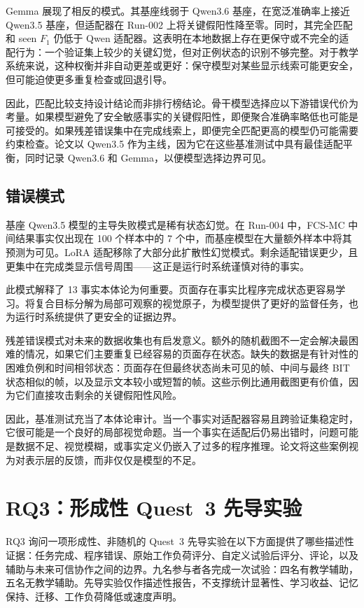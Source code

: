 Gemma 展现了相反的模式。其基座线弱于 Qwen3.6 基座，在宽泛准确率上接近 Qwen3.5 基座，但适配器在 Run-002 上将关键假阳性降至零。同时，其完全匹配和 seen \(F_1\) 仍低于 Qwen 适配器。这表明在本地数据上存在更保守或不完全的适配行为：一个验证集上较少的关键幻觉，但对正例状态的识别不够完整。对于教学系统来说，这种权衡并非自动更差或更好：保守模型对某些显示线索可能更安全，但可能迫使更多重复检查或回退引导。

因此，匹配比较支持设计结论而非排行榜结论。骨干模型选择应以下游错误代价为考量。如果模型避免了安全敏感事实的关键假阳性，即便聚合准确率略低也可能是可接受的。如果残差错误集中在完成线索上，即便完全匹配更高的模型仍可能需要约束检查。论文以 Qwen3.5 作为主线，因为它在这些基准测试中具有最佳适配平衡，同时记录 Qwen3.6 和 Gemma，以便模型选择边界可见。

\subsection{错误模式}

基座 Qwen3.5 模型的主导失败模式是稀有状态幻觉。在 Run-004 中，FCS-MC 中间结果事实仅出现在 100 个样本中的 7 个中，而基座模型在大量额外样本中将其预测为可见。LoRA 适配移除了大部分此扩散性幻觉模式。剩余适配错误更少，且更集中在完成类显示信号周围——这正是运行时系统谨慎对待的事实。

此模式解释了 13 事实本体论为何重要。页面存在事实比程序完成状态更容易学习。将复合目标分解为局部可观察的视觉原子，为模型提供了更好的监督任务，也为运行时系统提供了更安全的证据边界。

残差错误模式对未来的数据收集也有启发意义。额外的随机截图不一定会解决最困难的情况，如果它们主要重复已经容易的页面存在状态。缺失的数据是有针对性的困难负例和时间相邻状态：页面存在但最终状态尚未可见的帧、中间与最终 BIT 状态相似的帧，以及显示文本较小或短暂的帧。这些示例比通用截图更有价值，因为它们直接攻击剩余的关键假阳性风险。

因此，基准测试充当了本体论审计。当一个事实对适配器容易且跨验证集稳定时，它很可能是一个良好的局部视觉命题。当一个事实在适配后仍易出错时，问题可能是数据不足、视觉模糊，或事实定义仍嵌入了过多的程序推理。论文将这些案例视为对表示层的反馈，而非仅仅是模型的不足。

\section{RQ3：形成性 Quest~3 先导实验}\label{sec:eval-pilot}

RQ3 询问一项形成性、非随机的 Quest~3 先导实验在以下方面提供了哪些描述性证据：任务完成、程序错误、原始工作负荷评分、自定义试验后评分、评论，以及辅助与未来可信协作之间的边界。九名参与者各完成一次试验：四名有教学辅助，五名无教学辅助。先导实验仅作描述性报告，不支撑统计显著性、学习收益、记忆保持、迁移、工作负荷降低或速度声明。

